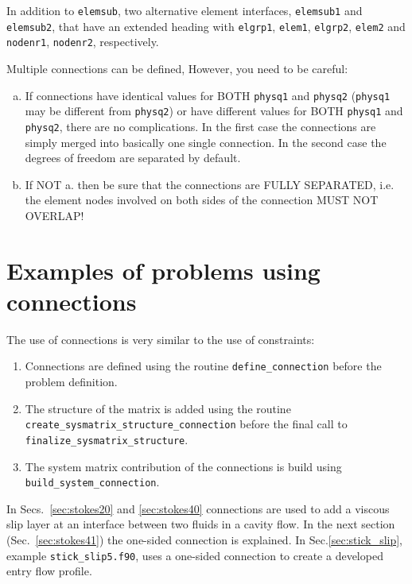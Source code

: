 In addition to \texttt{elemsub}, two alternative element interfaces,
\texttt{elemsub1} and \texttt{elemsub2}, that have an extended heading with
\texttt{elgrp1}, \texttt{elem1}, \texttt{elgrp2}, \texttt{elem2} and
\texttt{nodenr1}, \texttt{nodenr2}, respectively.

Multiple connections can be defined, However, 
you need to be careful:
\begin{enumerate}[a.]
\item   If connections have identical values for BOTH \texttt{physq1} and
        \texttt{physq2} (\texttt{physq1} may be different from \texttt{physq2})
        or have different values for BOTH \texttt{physq1} and \texttt{physq2},
        there are no complications. In the first case the connections are simply
        merged into basically one single connection. In the second case
        the degrees of freedom are separated by default.
\item   If NOT a. then be sure that the connections are FULLY SEPARATED, i.e.
        the element nodes involved on both sides of the connection MUST NOT
        OVERLAP!
\end{enumerate}


\section{Examples of problems using connections}

The use of connections is very similar to the use of constraints:
\begin{enumerate}
   \item Connections are defined using the routine \texttt{define\_connection}
     before the problem definition.
   \item The structure of the matrix is added using the routine
     \texttt{create\_sysmatrix\_structure\_connection} before the final call
    to \texttt{finalize\_sysmatrix\_structure}.
   \item The system matrix contribution of the connections is build using
     \texttt{build\_system\_connection}.
\end{enumerate}

In Secs.~\ref{sec:stokes20} and \ref{sec:stokes40} connections are
 used to add a viscous
slip layer at an interface between two fluids in a cavity flow.
In the next section
(Sec.~\ref{sec:stokes41}) the one-sided connection is explained.
In Sec.\ref{sec:stick_slip}, example \texttt{stick\_slip5.f90}, uses a one-sided
connection to create a developed entry flow profile.


